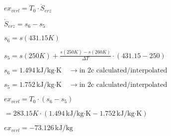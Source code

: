 \( ex_{verl} = T_0 \cdot \dot{S}_{erz} \)  

\( \dot{S}_{erz} = s_6 - s_5 \)  

\( s_6 = s(431.15K) \)  

\( s_5 = s(250K) + \frac{s(250K) - s(260K)}{\Delta T} \cdot (431.15 - 250) \)  

\( s_6 = 1.494 \, \text{kJ/kg·K} \quad \rightarrow \text{in 2c calculated/interpolated} \)  

\( s_5 = 1.752 \, \text{kJ/kg·K} \quad \rightarrow \text{in 2c calculated/interpolated} \)  

\( ex_{verl} = T_0 \cdot (s_6 - s_5) \)  

\( = 283.15K \cdot (1.494 \, \text{kJ/kg·K} - 1.752 \, \text{kJ/kg·K}) \)  

\( ex_{verl} = -73.126 \, \text{kJ/kg} \)